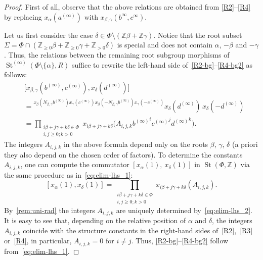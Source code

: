 \documentclass[oneside, 11pt]{amsart}
\numberwithin{equation}{section}
\theoremstyle{definition}
\theoremstyle{remark}
\DeclareMathOperator\St{St}
\newcommand{\ZZ}{\mathbb{Z}}
\newcommand{\up}[2]{{^{#1}\!{#2}}}
\begin{document}
\begin{proof}
 First of all, observe that the above relations are obtained from \eqref{R2}--\eqref{R4} by replacing $x_\alpha(a^{(\infty)})$ with $x_{\beta, \gamma}(b^{\infty}, c^{\infty})$.
 
 Let us first consider the case \(\delta \in \Phi \setminus (\ZZ \beta + \ZZ \gamma)\).
 Notice that the root subset $\Sigma = \Phi \cap (\ZZ_{\geq 0}\beta + \ZZ_{\geq 0}\gamma + \ZZ_{>0}\delta)$ is special and does not contain $\alpha$, $-\beta$ and $-\gamma$. Thus, the relations between the remaining root subgroup morphisms of $\St^{(\infty)}(\Phi\setminus\{\alpha\}, R)$ suffice to rewrite the left-hand side of~\eqref{R2-bg}--\eqref{R4-bg2} as follows:
 \begin{align}
  &\bigl[x_{\beta, \gamma}(b^{(\infty)}, c^{(\infty)}), x_\delta(d^{(\infty)})\bigr] \label{eq:elim-lhs_1} \\
  &= \up{x_\beta(N_{\beta, \gamma} b^{(\infty)})
   x_\gamma(c^{(\infty)})
   x_\beta(-N_{\beta, \gamma} b^{(\infty)})
   x_\gamma(-c^{(\infty)})}
  {x_\delta(d^{(\infty)})}\,
  x_\delta(-d^{(\infty)}) \nonumber \\
  &= \prod_{\substack{i\beta + j\gamma + k\delta \in \Phi\\ i, j \geq 0; k > 0}}
  x_{i\beta + j\gamma + k\delta} \bigl(A_{i, j, k} {b^{(\infty)}}^i {c^{(\infty)}}^j {d^{(\infty)}}^k\bigr). \nonumber
 \end{align}
 The integers \(A_{i, j, k}\) in the above formula depend only on the roots \(\beta\), \(\gamma\), \(\delta\) (a priori they also depend on the chosen order of factors). To determine the constants $A_{i,j,k}$, one can compute the commutator $[x_\alpha(1),\ x_\delta(1)]$ in $\St(\Phi, \ZZ)$ via the same procedure as in~\eqref{eq:elim-lhs_1}:
 \begin{equation} \label{eq:elim-lhs_2}
  [x_\alpha(1), x_\delta(1)] = \prod_{\substack{i\beta + j\gamma + k\delta \in \Phi\\ i, j \geq 0; k > 0}}
  x_{i\beta + j\gamma + k\delta}(A_{i, j, k}).
 \end{equation}
  By~\cref{rem:uni-rad} the integers $A_{i,j,k}$ are uniquely determined by~\eqref{eq:elim-lhs_2}.
  It is easy to see that, depending on the relative position of $\alpha$ and $\delta$, the integers $A_{i,j,k}$ coincide with the structure constants in the right-hand sides of~\eqref{R2},~\eqref{R3} or~\eqref{R4}, in particular, $A_{i,j,k}=0$ for $i\neq j$.
  Thus, \eqref{R2-bg}--\eqref{R4-bg2} follow from~\eqref{eq:elim-lhs_1}.
 

\end{proof}
\end{document}
